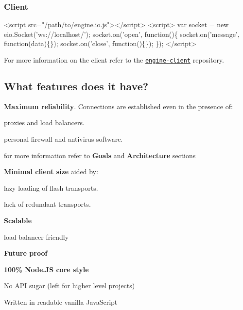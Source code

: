 \subsubsection*{Client}


\begin{DoxyCode}
<script src="/path/to/engine.io.js"></script>
<script>
  var socket = new eio.Socket('ws://localhost/');
  socket.on('open', function()\{
    socket.on('message', function(data)\{\});
    socket.on('close', function()\{\});
  \});
</script>
\end{DoxyCode}


For more information on the client refer to the \href{http://github.com/learnboost/engine.io-client}{\tt engine-\/client} repository.

\subsection*{What features does it have?}


\begin{DoxyItemize}
\item {\bfseries Maximum reliability}. Connections are established even in the presence of\+:
\begin{DoxyItemize}
\item proxies and load balancers.
\item personal firewall and antivirus software.
\item for more information refer to {\bfseries Goals} and {\bfseries Architecture} sections
\end{DoxyItemize}
\item {\bfseries Minimal client size} aided by\+:
\begin{DoxyItemize}
\item lazy loading of flash transports.
\item lack of redundant transports.
\end{DoxyItemize}
\item {\bfseries Scalable}
\begin{DoxyItemize}
\item load balancer friendly
\end{DoxyItemize}
\item {\bfseries Future proof}
\item {\bfseries 100\% Node.\+JS core style}
\begin{DoxyItemize}
\item No A\+PI sugar (left for higher level projects)
\item Written in readable vanilla Java\+Script
\end{DoxyItemize}
\end{DoxyItemize}

